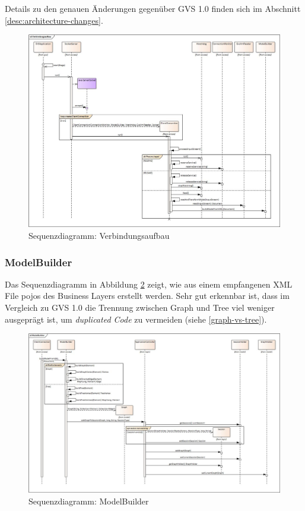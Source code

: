 \documentclass[11pt,a4paper,english,oneside]{book}
\numberwithin{equation}{chapter}
\begin{document}
	\noindent
	Details zu den genauen Änderungen gegenüber GVS 1.0 finden sich im Abschnitt \ref{desc:architecture-changes}.

	\begin{figure}[h!]
		\centering
		\includegraphics[width=\linewidth]{assets/images/sequence_Verbindungsaufbau}
		\caption{Sequenzdiagramm: Verbindungsaufbau}
		\label{fig:sd-verbindungsaufbau-2}
	\end{figure}

	\clearpage
	
	\subsubsection{ModelBuilder}
	Das Sequenzdiagramm in Abbildung \ref{fig:sd-modelbuilder-2} zeigt, wie aus einem empfangenen XML File \gls{pojo}s des Business Layers erstellt werden. Sehr gut erkennbar ist, dass im Vergleich zu GVS 1.0 die Trennung zwischen Graph und Tree viel weniger ausgeprägt ist, um \textit{duplicated Code} zu vermeiden (siehe \ref{graph-vs-tree}).
	\begin{figure}[h!]
		\centering
		\includegraphics[width=\linewidth]{assets/images/sequence_ModelBuilder}
		\caption{Sequenzdiagramm: ModelBuilder}
		\label{fig:sd-modelbuilder-2}
	\end{figure}	
\end{document}
